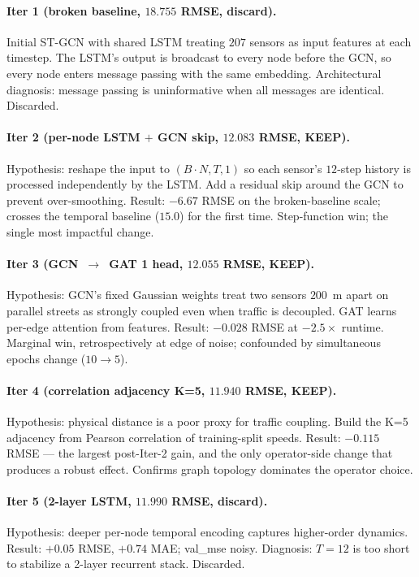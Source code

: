 \documentclass{article}
\begin{document}
\paragraph{Iter 1 (broken baseline, $18.755$ RMSE, discard).}
Initial ST-GCN with shared LSTM treating $207$ sensors as input features at each timestep. The LSTM's output is broadcast to every node before the GCN, so every node enters message passing with the same embedding. Architectural diagnosis: message passing is uninformative when all messages are identical. Discarded.

\paragraph{Iter 2 (per-node LSTM $+$ GCN skip, $12.083$ RMSE, KEEP).}
Hypothesis: reshape the input to $(B \cdot N, T, 1)$ so each sensor's $12$-step history is processed independently by the LSTM. Add a residual skip around the GCN to prevent over-smoothing. Result: $-6.67$ RMSE on the broken-baseline scale; crosses the temporal baseline ($15.0$) for the first time. Step-function win; the single most impactful change.

\paragraph{Iter 3 (GCN~$\to$~GAT 1 head, $12.055$ RMSE, KEEP).}
Hypothesis: GCN's fixed Gaussian weights treat two sensors $200$~m apart on parallel streets as strongly coupled even when traffic is decoupled. GAT learns per-edge attention from features. Result: $-0.028$ RMSE at $-2.5\times$ runtime. Marginal win, retrospectively at edge of noise; confounded by simultaneous epochs change ($10 \to 5$).

\paragraph{Iter 4 (correlation adjacency K=5, $11.940$ RMSE, KEEP).}
Hypothesis: physical distance is a poor proxy for traffic coupling. Build the K=5 adjacency from Pearson correlation of training-split speeds. Result: $-0.115$ RMSE --- the largest post-Iter-2 gain, and the only operator-side change that produces a robust effect. Confirms graph topology dominates the operator choice.

\paragraph{Iter 5 (2-layer LSTM, $11.990$ RMSE, discard).}
Hypothesis: deeper per-node temporal encoding captures higher-order dynamics. Result: $+0.05$ RMSE, $+0.74$ MAE; val\_mse noisy. Diagnosis: $T = 12$ is too short to stabilize a 2-layer recurrent stack. Discarded.
\end{document}

